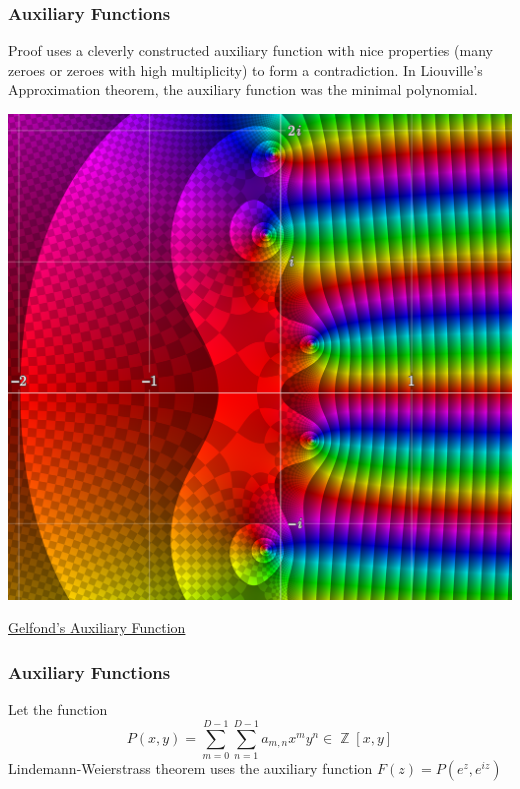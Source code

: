 \documentclass{beamer}
\DeclareMathOperator{\Z}{\mathbb{Z}}
\begin{document}
    \begin{frame}
    \frametitle{Auxiliary Functions}
    \begin{center}
    Proof uses a cleverly constructed auxiliary function with nice properties (many zeroes or zeroes with high multiplicity) to form a contradiction. In Liouville's Approximation theorem, the auxiliary function was the minimal polynomial.\par

    \includegraphics[scale=0.1]{img/domain.png}\par
    \href{https://samuelj.li/complex-function-plotter/}{Gelfond's Auxiliary Function}
    \end{center}
    \end{frame}

    \begin{frame}
    \frametitle{Auxiliary Functions}
    \begin{center}
        Let the function
        \[P(x,y) = \sum\limits_{m=0}^{D-1}\sum\limits_{n=1}^{D-1}a_{m,n}{x}^{m}y^{n} \in \Z[x,y]\]
        Lindemann-Weierstrass theorem uses the auxiliary function $F(z) = P(e^{z}, e^{iz})$
    \end{center}
    \end{frame}
\end{document}
